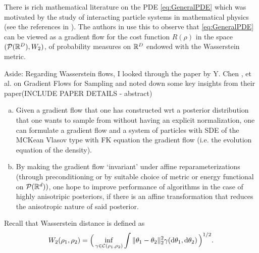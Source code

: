 \documentclass{article}
\begin{document}
There is rich mathematical literature on the PDE \eqref{eq:GeneralPDE} which was
motivated by the study of interacting particle systems in mathematical physics (see the references in \cite{Mei_2018}). The authors in \cite{Mei_2018} use this to observe that \eqref{eq:GeneralPDE} can be viewed as a gradient flow for the cost function $R(\rho)$ in the space 
$( \mathcal{P}(\mathbb{R}^D),W_2)$, of probability measures on $\mathbb{R}^D$
endowed with the Wasserstein metric.\\

\begin{examplesblock}{Aside:}\label{aside: wasserstein flow}
Regarding Wasserstein flows, I looked through the paper by Y. Chen , et al. \cite{chen2023gradientflowssamplingmeanfield} on Gradient Flows for Sampling and noted down some key insights from their paper(INCLUDE PAPER DETAILS - abstract)
\begin{enumerate}[(a)]
    
	\item 	Given a gradient flow that one has constructed wrt a posterior distribution that one wants to sample from without having an explicit normalization, one can formulate a gradient flow and a system of particles with SDE of the MCKean Vlasov type with FK equation the gradient flow (i.e. the evolution equation of the density). 
	\item 	By making the gradient flow ‘invariant’ under affine reparameterizations (through preconditioning or by suitable choice of metric or energy functional on $\mathcal{P}(\mathbb{R}^d))$, one hope to improve performance of algorithms in the case of highly anisotripic posteriors, if there is an affine transformation that reduces the anisotropic nature of said posterior.
\end{enumerate}
\end{examplesblock}



Recall that Wasserstein distance is defined as
\begin{equation}\label{eq:Wasserstein_dual}
W_2(\rho_1,\rho_2)  = \Big(\inf_{\gamma\in \mathcal{C}(\rho_1,\rho_2)}  \int \| \mathbf{\theta}_1- \mathbf{\theta}_2 \|_2^2 \gamma( \operatorname{d}\!  \mathbf{\theta}_1, \operatorname{d}\! \mathbf{\theta}_2) \,\Big)^{1/2}. 
\end{equation}
\end{document}
